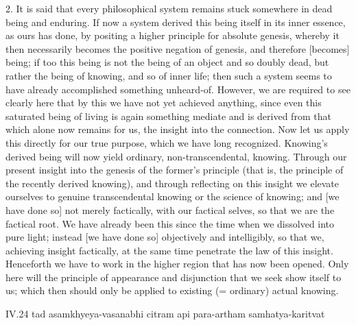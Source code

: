 2. It is said that every philosophical system
remains stuck somewhere in dead being and enduring.
If now a system derived this being itself in its inner essence,
as ours has done, by positing
a higher principle for absolute genesis,
whereby it then necessarily becomes
the positive negation of genesis,
and therefore [becomes] being;
if too this being is not the being of an object and so doubly dead,
but rather the being of knowing, and so of inner life;
then such a system seems to have already
accomplished something unheard-of.
However, we are required to see clearly here that
by this we have not yet achieved anything,
since even this saturated being of living is
again something mediate
and is derived from that
which alone now remains for us,
the insight into the connection.
Now let us apply this directly for our true purpose,
which we have long recognized.
Knowing's derived being will now yield
ordinary, non-transcendental, knowing.
Through our present insight into
the genesis of the former's principle
(that is, the principle of the recently derived knowing),
and through reflecting on this insight
we elevate ourselves to genuine transcendental knowing
or the science of knowing;
and [we have done so] not merely factically,
with our factical selves,
so that we are the factical root.
We have already been this since
the time when we dissolved into pure light;
instead [we have done so] objectively and intelligibly,
so that we, achieving insight factically,
at the same time penetrate the law of this insight.
Henceforth we have to work in the higher region
that has now been opened.
Only here will the principle of
appearance and disjunction
that we seek show itself to us;
which then should only be applied to
existing (= ordinary) actual knowing.

IV.24
tad asamkhyeya-vasanabhi citram api para-artham samhatya-karitvat

